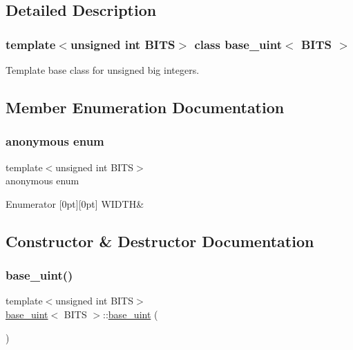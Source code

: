 \subsection{Detailed Description}
\subsubsection*{template$<$unsigned int B\+I\+TS$>$\newline
class base\+\_\+uint$<$ B\+I\+T\+S $>$}

Template base class for unsigned big integers. 

\subsection{Member Enumeration Documentation}
\mbox{\label{classbase__uint_afee51629f03ba95d823ab4ee94cf6c81}} 
\subsubsection{\texorpdfstring{anonymous enum}{anonymous enum}}
{\footnotesize\ttfamily template$<$unsigned int B\+I\+TS$>$ \\
anonymous enum\hspace{0.3cm}{\ttfamily [protected]}}

\begin{DoxyEnumFields}{Enumerator}
[0pt][0pt]{}\mbox{\label{classbase__uint_afee51629f03ba95d823ab4ee94cf6c81adf579395d753e2d9607ecd61424f0853}} 
W\+I\+D\+TH&\\
\hline

\end{DoxyEnumFields}


\subsection{Constructor \& Destructor Documentation}
\mbox{\label{classbase__uint_aafd4418923a92b58a1c360e657fa7d83}} 
\subsubsection{\texorpdfstring{base\+\_\+uint()}{base\_uint()}\hspace{0.1cm}{\footnotesize\ttfamily [1/4]}}
{\footnotesize\ttfamily template$<$unsigned int B\+I\+TS$>$ \\
\mbox{\hyperlink{classbase__uint}{base\+\_\+uint}}$<$ B\+I\+TS $>$\+::\mbox{\hyperlink{classbase__uint}{base\+\_\+uint}} (\begin{DoxyParamCaption}{ }\end{DoxyParamCaption})\hspace{0.3cm}{\ttfamily [inline]}}

